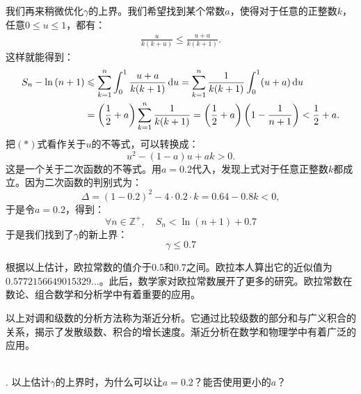 \documentclass[12pt,UTF8,fontset=none]{ctexbook}
\begin{document}
\begin{so}
    我们再来稍微优化$\gamma$的上界。我们希望找到某个常数$a$，使得对于任意的正整数$k$，任意$0\leqslant u \leqslant 1$，都有：
    \begin{align*}
        \frac{u}{k(k + u)} \leqslant \frac{u + a}{k(k + 1)}. \tag{$\ast$}
    \end{align*}
    这样就能得到：
    \begin{align*}       
        S_n - \ln{(n+1)} &\leqslant \sum_{k=1}^{n} \int_0^{1} \frac{u + a}{k(k + 1)}\,\mathrm{d}u = \sum_{k=1}^{n} \frac{1}{k(k + 1)} \int_0^{1} (u + a)\,\mathrm{d}u \\
        &= \left(\frac{1}{2} + a\right) \sum_{k=1}^{n} \frac{1}{k(k + 1)} = \left(\frac{1}{2} + a\right) \left( 1 - \frac{1}{n+1} \right) < \frac{1}{2} + a.
    \end{align*}
    把$(\ast)$式看作关于$u$的不等式，可以转换成：
    $$ u^2 - (1 - a)u + ak > 0. $$
    这是一个关于二次函数的不等式。用$a = 0.2$代入，发现上式对于任意正整数$k$都成立。因为二次函数的判别式为：
    $$ \Delta = (1 - 0.2)^2 - 4\cdot 0.2\cdot k = 0.64 - 0.8k < 0, $$
    于是令$a=0.2$，得到：
    $$\forall n \in \mathbb{Z}^+, \quad S_n < \ln{(n+1)} + 0.7 $$
    于是我们找到了$\gamma$的新上界：
    $$ \gamma \leqslant 0.7 $$
    
    根据以上估计，欧拉常数的值介于$0.5$和$0.7$之间。欧拉本人算出它的近似值为$0.5772156649015329\dots$。此后，数学家对欧拉常数展开了更多的研究。欧拉常数在数论、组合数学和分析学中有着重要的应用。
\end{so}

以上对调和级数的分析方法称为渐近分析。它通过比较级数的部分和与广义积合的关系，揭示了发散级数、积合的增长速度。渐近分析在数学和物理学中有着广泛的应用。

\begin{sk}
    \mbox{} \\
    . 以上估计$\gamma$的上界时，为什么可以让$a=0.2$？能否使用更小的$a$？ \\
\end{sk}
\end{document}
